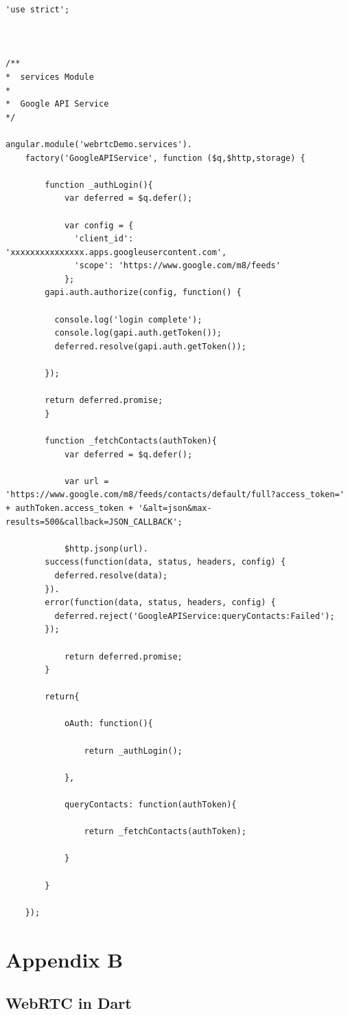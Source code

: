 \begin{appendices}
\begin{lstlisting}[caption={GoogleAPIService.js in application client},label={code:google_api}]
'use strict';



/**
*  services Module
*
*  Google API Service
*/

angular.module('webrtcDemo.services').
	factory('GoogleAPIService', function ($q,$http,storage) {

		function _authLogin(){
			var deferred = $q.defer();

			var config = {
		      'client_id': 'xxxxxxxxxxxxxxx.apps.googleusercontent.com',
		      'scope': 'https://www.google.com/m8/feeds'
		    };
	    gapi.auth.authorize(config, function() {

	      console.log('login complete');
	      console.log(gapi.auth.getToken());
	      deferred.resolve(gapi.auth.getToken());

	    });

	    return deferred.promise;
		}

		function _fetchContacts(authToken){
			var deferred = $q.defer();

			var url = 'https://www.google.com/m8/feeds/contacts/default/full?access_token=' + authToken.access_token + '&alt=json&max-results=500&callback=JSON_CALLBACK';

			$http.jsonp(url).
	    success(function(data, status, headers, config) {
	      deferred.resolve(data);
	    }).
	    error(function(data, status, headers, config) {
	      deferred.reject('GoogleAPIService:queryContacts:Failed');
	    });

			return deferred.promise;
		}

		return{
			
			oAuth: function(){

				return _authLogin();
			
			},

			queryContacts: function(authToken){

				return _fetchContacts(authToken);

			}

		}

	});
\end{lstlisting}

\chapter{Appendix B}

\section{WebRTC in Dart} \label{research:dart_webrtcctrl}


\end{appendices}
